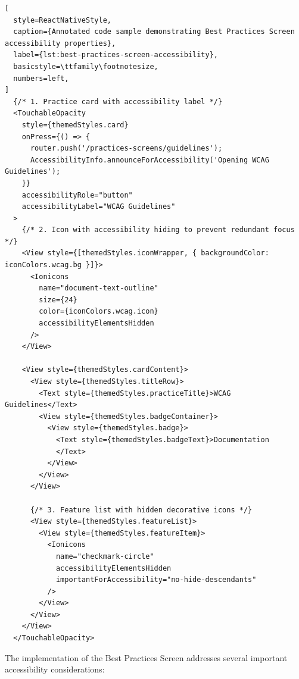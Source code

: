 \begin{lstlisting}[
  style=ReactNativeStyle,
  caption={Annotated code sample demonstrating Best Practices Screen accessibility properties},
  label={lst:best-practices-screen-accessibility},
  basicstyle=\ttfamily\footnotesize,
  numbers=left,
]
  {/* 1. Practice card with accessibility label */}
  <TouchableOpacity
    style={themedStyles.card}
    onPress={() => {
      router.push('/practices-screens/guidelines');
      AccessibilityInfo.announceForAccessibility('Opening WCAG Guidelines');
    }}
    accessibilityRole="button"
    accessibilityLabel="WCAG Guidelines"
  >
    {/* 2. Icon with accessibility hiding to prevent redundant focus */}
    <View style={[themedStyles.iconWrapper, { backgroundColor: iconColors.wcag.bg }]}>
      <Ionicons
        name="document-text-outline"
        size={24}
        color={iconColors.wcag.icon}
        accessibilityElementsHidden
      />
    </View>

    <View style={themedStyles.cardContent}>
      <View style={themedStyles.titleRow}>
        <Text style={themedStyles.practiceTitle}>WCAG Guidelines</Text>
        <View style={themedStyles.badgeContainer}>
          <View style={themedStyles.badge}>
            <Text style={themedStyles.badgeText}>Documentation
            </Text>
          </View>
        </View>
      </View>

      {/* 3. Feature list with hidden decorative icons */}
      <View style={themedStyles.featureList}>
        <View style={themedStyles.featureItem}>
          <Ionicons
            name="checkmark-circle"
            accessibilityElementsHidden
            importantForAccessibility="no-hide-descendants"
          />
        </View>
      </View>
    </View>
  </TouchableOpacity>
\end{lstlisting}

The implementation of the Best Practices Screen addresses several important accessibility considerations:

